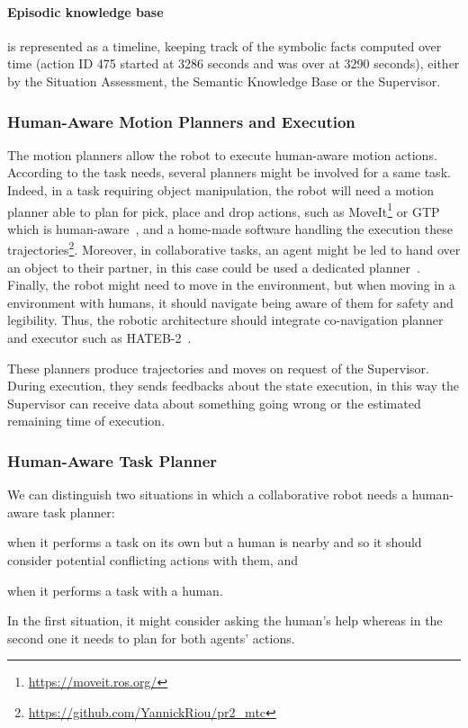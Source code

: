 \documentclass[a4paper,11pt,twoside]{StyleThese}
\begin{document}
\paragraph{Episodic knowledge base} is represented as a timeline, keeping track of the symbolic facts computed over time (\eg action ID 475 started at 3286 seconds and was over at 3290 seconds), either by the Situation Assessment, the Semantic Knowledge Base or the Supervisor. 


\subsubsection{Human-Aware Motion Planners and Execution}
The motion planners allow the robot to execute human-aware motion actions. According to the task needs, several planners might be involved for a same task. Indeed, in a task requiring object manipulation, the robot will need a motion planner able to plan for pick, place and drop actions, such as MoveIt\footnote{\url{https://moveit.ros.org/}} or GTP which is human-aware~\cite{waldhart_2016_novel}, and a home-made software handling the execution these trajectories\footnote{\url{https://github.com/YannickRiou/pr2_mtc}}. Moreover, in collaborative tasks, an agent might be led to hand over an object to their partner, in this case could be used a dedicated planner~\cite{mainprice_2012_sharing}. Finally, the robot might need to move in the environment, but when moving in a environment with humans, it should navigate being aware of them for safety and legibility. Thus, the robotic architecture should integrate co-navigation planner and executor such as HATEB-2~\cite{singamaneni_2020_hateb}. 

These planners produce trajectories and moves on request of the Supervisor. During execution, they sends feedbacks about the state execution, in this way the Supervisor can receive data about something going wrong or the estimated remaining time of execution. 

\subsubsection{Human-Aware Task Planner}\label{chap3:subsubsec:task_planner}
We can distinguish two situations in which a collaborative robot needs a human-aware task planner: 
\begin{inlineEnumerate}
	\item when it performs a task on its own but a human is nearby and so it should consider potential conflicting actions with them, and
	\item when it performs a task with a human.
\end{inlineEnumerate} 
In the first situation, it might consider asking the human's help whereas in the second one it needs to plan for both agents' actions. 
\end{document}
